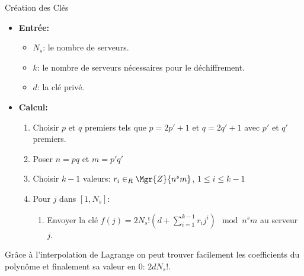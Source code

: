 	\begin{algo}{Création des Clés}
		\begin{itemize}\renewcommand{\labelitemi}{} \renewcommand{\labelitemii}{$\cdot$}
			\item{\bf Entrée:} 
				\begin{itemize}
					\item $N_s$: le nombre de serveurs.
					\item $k$: le nombre de serveurs nécessaires pour le déchiffrement.
					\item $d$: la clé privé.
				\end{itemize}
			\item{\bf Calcul:}
				\begin{enumerate} %
				\renewcommand{\theenumi}{\arabic{enumi}}
				\renewcommand{\theenumii}{\arabic{enumii}}
				\renewcommand{\theenumiii}{\arabic{enumiii}}
				\renewcommand{\labelenumi}{\theenumi.}
				\renewcommand{\labelenumii}{\theenumi.\theenumii.}
				\renewcommand{\labelenumiii}{\theenumi.\theenumii.\theenumiii.}
				\makeatletter
				\renewcommand{\p@enumii}{\theenumi.}
				\renewcommand{\p@enumiii}{\theenumi.\theenumii.}
				\makeatother
				\item Choisir $p$ et $q$ premiers tels que $p = 2p'+1$ et $q = 2q'+1$ avec $p'$ et $q'$ premiers.
				\item Poser $n = pq$ et $m = p'q'$
				\item Choisir $k-1$ valeurs: $r_i\in_R \Mgr{Z}{n^sm}$, $1 \leq i \leq k-1$
				\item Pour $j$ dans $[1,N_s]$:
					\begin{enumerate}
						\item Envoyer la clé $f(j) = 2N_s!(d+\sum_{i = 1}^{k-1}r_ij^i)\mod{n^sm}$ au serveur $j$.
					\end{enumerate}
				\end{enumerate}
		\end{itemize}
	\end{algo}

	Grâce à l'interpolation de Lagrange on peut trouver facilement les coefficients du polynôme et finalement sa valeur 
	en $0$: $2dN_s!$.

%
%



